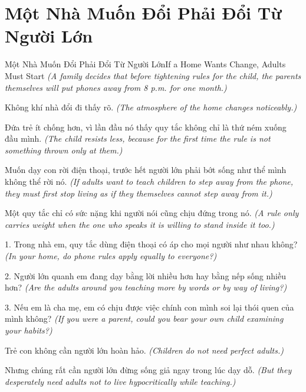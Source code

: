 \section{Một Nhà Muốn Đổi Phải Đổi Từ Người Lớn}
\begin{truyen}{Một Nhà Muốn Đổi Phải Đổi Từ Người Lớn}{If a Home Wants Change, Adults Must Start}
\textit{(A family decides that before tightening rules for the child, the parents themselves will put phones away from 8 p.m. for one month.)}

Không khí nhà đổi đi thấy rõ.
\textit{(The atmosphere of the home changes noticeably.)}

Đứa trẻ ít chống hơn, vì lần đầu nó thấy quy tắc không chỉ là thứ ném xuống đầu mình.
\textit{(The child resists less, because for the first time the rule is not something thrown only at them.)}

\end{truyen}

\begin{baihoc}
Muốn dạy con rời điện thoại, trước hết người lớn phải bớt sống như thể mình không thể rời nó.
\textit{(If adults want to teach children to step away from the phone, they must first stop living as if they themselves cannot step away from it.)}

Một quy tắc chỉ có sức nặng khi người nói cũng chịu đứng trong nó.
\textit{(A rule only carries weight when the one who speaks it is willing to stand inside it too.)}
\end{baihoc}

\begin{tuhocnhanh}
1. Trong nhà em, quy tắc dùng điện thoại có áp cho mọi người như nhau không? \textit{(In your home, do phone rules apply equally to everyone?)}

2. Người lớn quanh em đang dạy bằng lời nhiều hơn hay bằng nếp sống nhiều hơn? \textit{(Are the adults around you teaching more by words or by way of living?)}

3. Nếu em là cha mẹ, em có chịu được việc chính con mình soi lại thói quen của mình không? \textit{(If you were a parent, could you bear your own child examining your habits?)}
\end{tuhocnhanh}

\begin{tongketchuong}
Trẻ con không cần người lớn hoàn hảo.
\textit{(Children do not need perfect adults.)}

Nhưng chúng rất cần người lớn đừng sống giả ngay trong lúc dạy dỗ.
\textit{(But they desperately need adults not to live hypocritically while teaching.)}
\end{tongketchuong}

\ngancach